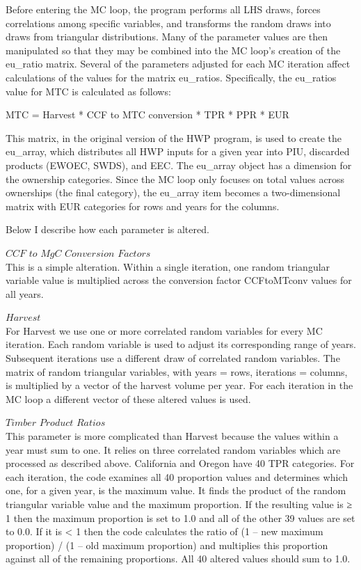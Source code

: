 \documentclass[
]{book}
\begin{document}
Before entering the MC loop, the program performs all LHS draws, forces correlations among specific variables, and transforms the random draws into draws from triangular distributions. Many of the parameter values are then manipulated so that they may be combined into the MC loop's creation of the eu\_ratio matrix. Several of the parameters adjusted for each MC iteration affect calculations of the values for the matrix eu\_ratios. Specifically, the eu\_ratios value for MTC is calculated as follows:

MTC = Harvest * CCF to MTC conversion * TPR * PPR * EUR

This matrix, in the original version of the HWP program, is used to create the eu\_array, which distributes all HWP inputs for a given year into PIU, discarded products (EWOEC, SWDS), and EEC. The eu\_array object has a dimension for the ownership categories. Since the MC loop only focuses on total values across ownerships (the final category), the eu\_array item becomes a two-dimensional matrix with EUR categories for rows and years for the columns.

Below I describe how each parameter is altered.

\(\textit{CCF to MgC Conversion Factors}\)\\
This is a simple alteration. Within a single iteration, one random triangular variable value is multiplied across the conversion factor CCFtoMTconv values for all years.

\(\textit{Harvest}\)\\
For Harvest we use one or more correlated random variables for every MC iteration. Each random variable is used to adjust its corresponding range of years. Subsequent iterations use a different draw of correlated random variables. The matrix of random triangular variables, with years = rows, iterations = columns, is multiplied by a vector of the harvest volume per year. For each iteration in the MC loop a different vector of these altered values is used.

\(\textit{Timber Product Ratios}\)\\
This parameter is more complicated than Harvest because the values within a year must sum to one. It relies on three correlated random variables which are processed as described above. California and Oregon have 40 TPR categories. For each iteration, the code examines all 40 proportion values and determines which one, for a given year, is the maximum value. It finds the product of the random triangular variable value and the maximum proportion. If the resulting value is ≥ 1 then the maximum proportion is set to 1.0 and all of the other 39 values are set to 0.0. If it is \textless{} 1 then the code calculates the ratio of (1 -- new maximum proportion) / (1 -- old maximum proportion) and multiplies this proportion against all of the remaining proportions. All 40 altered values should sum to 1.0.
\end{document}
